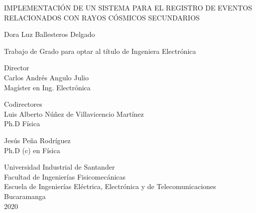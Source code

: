 
\begin{center}

IMPLEMENTACI\'ON DE UN SISTEMA PARA EL REGISTRO DE EVENTOS RELACIONADOS CON RAYOS C\'OSMICOS SECUNDARIOS\vfill%

Dora Luz Ballesteros Delgado%

Trabajo de Grado para optar al t\'itulo de Ingeniera Electr\'onica\vfill %

Director\\
Carlos Andr\'es Angulo Julio\\
Magíster en Ing. Electr\'onica\bigskip

Codirectores\\
Luis Alberto Núñez de Villavicencio Martínez \\
Ph.D  Física \bigskip

Jesús Peña Rodríguez\\
Ph.D (c) en F\'isica
\vfill

Universidad Industrial de Santander\\
Facultad de Ingenier\'ias Fisicomec\'anicas\\
Escuela de Ingenier\'ias El\'ectrica, Electr\'onica y de Telecomunicaciones\\
Bucaramanga\\
2020
\end{center}

\newpage


